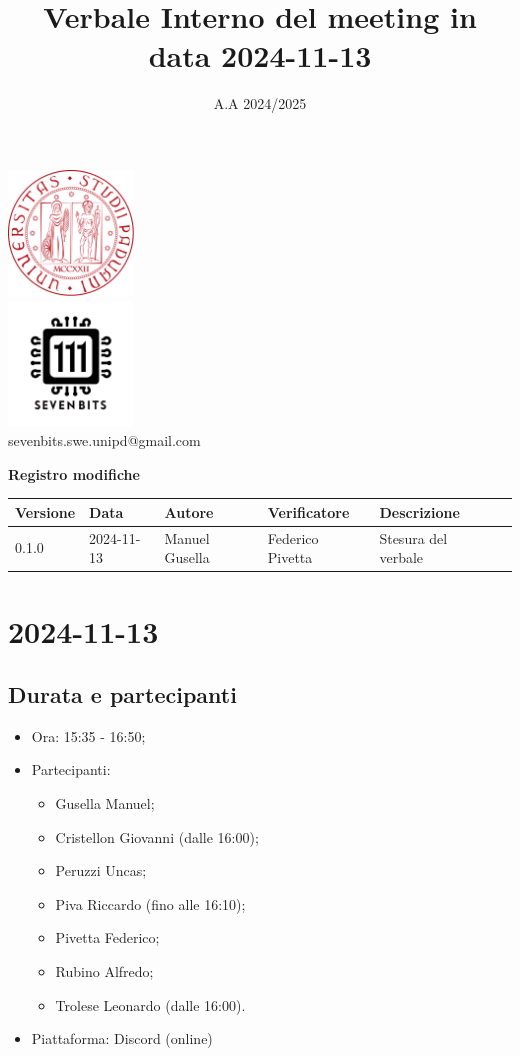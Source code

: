 \documentclass[10pt]{article}
\title{Verbale Interno del meeting in data 2024-11-13}
\date{A.A 2024/2025}
\begin{document}
\maketitle
\begin{center}
\includegraphics[width=0.25\textwidth]{LogoUnipd}\\
\includegraphics[width=0.25\textwidth]{Sevenbitslogo}\\
sevenbits.swe.unipd@gmail.com\\
\vspace{2mm}

\textbf{Registro modifiche}\\
\vspace{2mm}
\begin{tabular}{|l|l|l|l|l|l|}
\hline
\textbf{Versione} & \textbf{Data} & \textbf{Autore} & \textbf{Verificatore} & \textbf{Descrizione} \\
\hline
0.1.0 & 2024-11-13 & Manuel Gusella & Federico Pivetta & Stesura del verbale\\
\hline
\end{tabular}
\end{center}

\newpage
\tableofcontents
\newpage
\section{2024-11-13}
\subsection{Durata e partecipanti}
\begin{itemize}
\item Ora: 15:35 - 16:50;
\item Partecipanti: 	
	\begin{itemize}
	\item Gusella Manuel;
	\item Cristellon Giovanni (dalle 16:00);
	\item Peruzzi Uncas;
	\item Piva Riccardo (fino alle 16:10);
	\item Pivetta Federico;
	\item Rubino Alfredo;
	\item Trolese Leonardo (dalle 16:00).
	\end{itemize}
\item Piattaforma: Discord (online)
\end{itemize}
\end{document}
